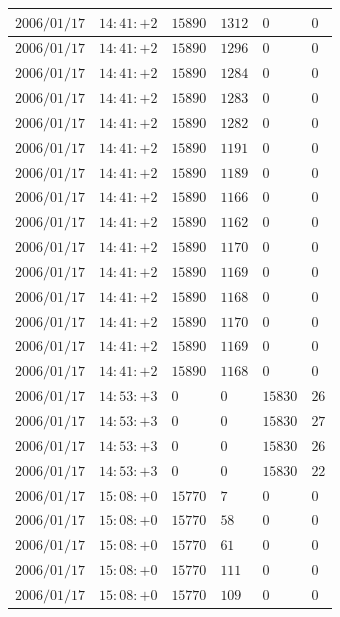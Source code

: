 \documentclass[a4j,papersize,disablejfam,slide,14pt]{jsarticle}
\begin{document}
\begin{description}
\begin{center}
\begin{longtable}{|l|l|l|l|l|l|}
					$2006/01/17$ & $14:41:+2$  & $15890$ & $1312$ & $0$ & $0$ \\ \hline
					$2006/01/17$ & $14:41:+2$  & $15890$ & $1296$ & $0$ & $0$ \\ \hline
					$2006/01/17$ & $14:41:+2$  & $15890$ & $1284$ & $0$ & $0$ \\ \hline
					$2006/01/17$ & $14:41:+2$  & $15890$ & $1283$ & $0$ & $0$ \\ \hline
					$2006/01/17$ & $14:41:+2$  & $15890$ & $1282$ & $0$ & $0$ \\ \hline
					$2006/01/17$ & $14:41:+2$  & $15890$ & $1191$ & $0$ & $0$ \\ \hline
					$2006/01/17$ & $14:41:+2$  & $15890$ & $1189$ & $0$ & $0$ \\ \hline
					$2006/01/17$ & $14:41:+2$  & $15890$ & $1166$ & $0$ & $0$ \\ \hline
					$2006/01/17$ & $14:41:+2$  & $15890$ & $1162$ & $0$ & $0$ \\ \hline
					$2006/01/17$ & $14:41:+2$  & $15890$ & $1170$ & $0$ & $0$ \\ \hline
					$2006/01/17$ & $14:41:+2$  & $15890$ & $1169$ & $0$ & $0$ \\ \hline
					$2006/01/17$ & $14:41:+2$  & $15890$ & $1168$ & $0$ & $0$ \\ \hline
					$2006/01/17$ & $14:41:+2$  & $15890$ & $1170$ & $0$ & $0$ \\ \hline
					$2006/01/17$ & $14:41:+2$  & $15890$ & $1169$ & $0$ & $0$ \\ \hline
					$2006/01/17$ & $14:41:+2$  & $15890$ & $1168$ & $0$ & $0$ \\ \hline
					$2006/01/17$ & $14:53:+3$  & $0$ & $0$ & $15830$ & $26$ \\ \hline
					$2006/01/17$ & $14:53:+3$  & $0$ & $0$ & $15830$ & $27$ \\ \hline
					$2006/01/17$ & $14:53:+3$  & $0$ & $0$ & $15830$ & $26$ \\ \hline
					$2006/01/17$ & $14:53:+3$  & $0$ & $0$ & $15830$ & $22$ \\ \hline
					$2006/01/17$ & $15:08:+0$  & $15770$ & $7$ & $0$ & $0$ \\ \hline
					$2006/01/17$ & $15:08:+0$  & $15770$ & $58$ & $0$ & $0$ \\ \hline
					$2006/01/17$ & $15:08:+0$  & $15770$ & $61$ & $0$ & $0$ \\ \hline
					$2006/01/17$ & $15:08:+0$  & $15770$ & $111$ & $0$ & $0$ \\ \hline
					$2006/01/17$ & $15:08:+0$  & $15770$ & $109$ & $0$ & $0$ \\ \hline

\end{longtable}
\end{center}
\end{description}
\end{document}
